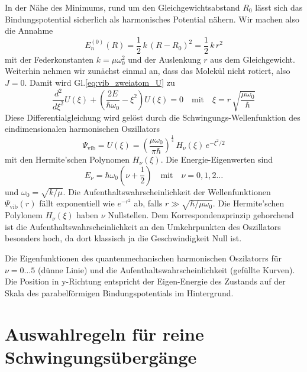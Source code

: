 In der Nähe des Minimums, rund um den Gleichgewichtsabstand $R_0$ lässt sich das Bindungspotential sicherlich als harmonisches Potential nähern. Wir machen also die Annahme
\begin{equation}
E_n^{(0)}(R)  = \frac{1}{2} \, k \, (R - R_0 )^2 = \frac{1}{2} \, k \, r^2 
\end{equation}
mit der Federkonstanten $k = \mu \omega_0^2$ und der Auslenkung $r$ aus dem Gleichgewicht. Weiterhin nehmen wir zunächst einmal an, dass das Molekül nicht rotiert, also $J=0$.  Damit wird Gl.\ref{eq:vib_zweiatom_U} zu
\begin{equation}
 \frac{d^2}{d \xi^2} U(\xi) + \left( \frac{2 E }{\hbar \omega_0}  - \xi^2  \right) U(\xi) = 0 \quad \text{mit} \quad \xi =  r \, \sqrt{\frac{\mu \omega_0}{\hbar}  }
\end{equation}
Diese Differentialgleichung wird gelöst durch die Schwingungs-Wellenfunktion des eindimensionalen harmonischen Oszillators
\begin{equation}
\Psi_\text{vib} =  U(\xi) = \left(\frac{\mu \omega_0}{\pi \hbar} \right)^{\frac{1}{4}} \,
 H_\nu(\xi) \, e^{- \xi^2 /2}
\end{equation}
mit den Hermite'schen Polynomen $H_\nu(\xi)$.
Die Energie-Eigenwerten sind
\begin{equation}
E_\nu = \hbar \omega_0 (\nu + \frac{1}{2} ) \quad \text{mit} \quad \nu = 0, 1, 2 \dots
\end{equation}
und $\omega_0 = \sqrt{k / \mu}$. Die Aufenthaltswahrscheinlichkeit der Wellenfunktionen $\Psi_\text{vib}(r)$ fällt exponentiell wie $e^{-r^2}$ ab, falls $r \gg \sqrt{\hbar / \mu \omega_0}$. Die Hermite'schen Polylonem $H_\nu(\xi)$ haben $\nu$ Nullstellen. Dem Korrespondenzprinzip gehorchend ist die 
Aufenthaltswahrscheinlichkeit an den Umkehrpunkten des Oszillators besonders hoch, da dort klassisch ja die Geschwindigkeit Null ist.


\begin{marginfigure}
\caption{Die Eigenfunktionen des quantenmechanischen harmonischen Oszilatorrs für $\nu = 0 \dots 5$ (dünne Linie) und die Aufenthaltswahrscheinlichkeit (gefüllte Kurven). Die Position in y-Richtung entspricht der Eigen-Energie des Zustands auf der Skala des parabelförmigen Bindungspotentials im Hintergrund.
\label{fig:vib_1d_WF}}
\end{marginfigure}


\section{Auswahlregeln für reine Schwingungsübergänge}

